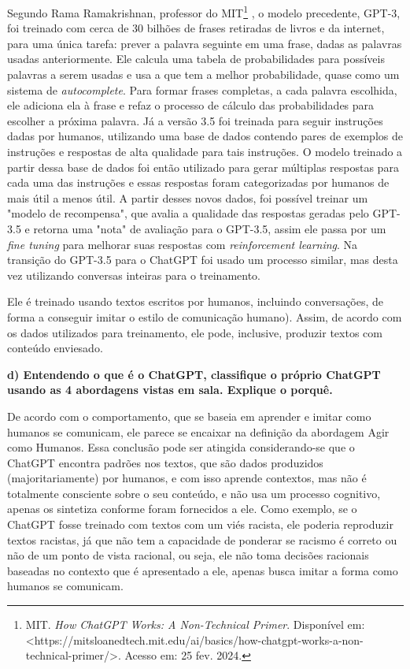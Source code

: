 Segundo Rama Ramakrishnan, professor do MIT\footnote{MIT. \textit{How ChatGPT Works: A Non-Technical Primer}. Disponível em: <https://mitsloanedtech.mit.edu/ai/basics/how-chatgpt-works-a-non-technical-primer/>. Acesso em: 25 fev. 2024.}
, o modelo precedente, GPT-3, foi treinado com cerca de 30 bilhões de frases retiradas de livros e da internet, para uma única tarefa: prever a palavra seguinte em uma frase, dadas as palavras usadas anteriormente. Ele calcula uma tabela de probabilidades para possíveis palavras a serem usadas e usa a que tem a melhor probabilidade, quase como um sistema de \textit{autocomplete}. Para formar frases completas, a cada palavra escolhida, ele adiciona ela à frase e refaz o processo de cálculo das probabilidades para escolher a próxima palavra. Já a versão 3.5 foi treinada para seguir instruções dadas por humanos, utilizando uma base de dados contendo pares de exemplos de instruções e respostas de alta qualidade para tais instruções. O modelo treinado a partir dessa base de dados foi então utilizado para gerar múltiplas respostas para cada uma das instruções e essas respostas foram categorizadas por humanos de mais útil a menos útil. A partir desses novos dados, foi possível treinar um "modelo de recompensa", que avalia a qualidade das respostas geradas pelo GPT-3.5 e retorna uma "nota" de avaliação para o GPT-3.5, assim ele passa por um \textit{fine tuning} para melhorar suas respostas com \textit{reinforcement learning}. Na transição do GPT-3.5 para o ChatGPT foi usado um processo similar, mas desta vez utilizando conversas inteiras para o treinamento.

Ele é treinado usando textos escritos por humanos, incluindo conversações, de forma a conseguir imitar o estilo de comunicação humano). Assim, de acordo com os dados utilizados para treinamento, ele pode, inclusive, produzir textos com conteúdo enviesado.

\begin{adjustwidth}{1em}{}
\textbf{d) Entendendo o que é o ChatGPT, classifique o próprio ChatGPT usando as 4
abordagens vistas em sala. Explique o porquê.}
\end{adjustwidth}

De acordo com o comportamento, que se baseia em aprender e imitar como humanos se comunicam, ele parece se encaixar na definição da abordagem Agir como Humanos. Essa conclusão pode ser atingida considerando-se que o ChatGPT encontra padrões nos textos, que são dados produzidos (majoritariamente) por humanos, e com isso aprende contextos, mas não é totalmente consciente sobre o seu conteúdo, e não usa um processo cognitivo, apenas os sintetiza conforme foram fornecidos a ele. Como exemplo, se o ChatGPT fosse treinado com textos com um viés racista, ele poderia reproduzir textos racistas, já que não tem a capacidade de ponderar se racismo é correto ou não de um ponto de vista racional, ou seja, ele não toma decisões racionais baseadas no contexto que é apresentado a ele, apenas busca imitar a forma como humanos se comunicam.

